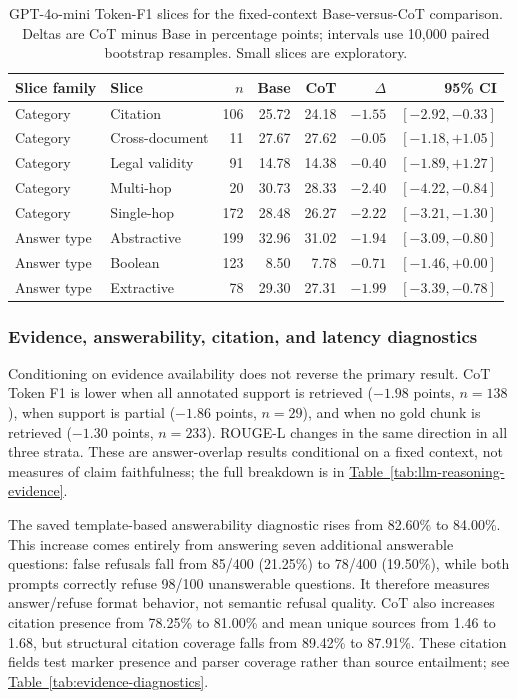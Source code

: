 \begin{table}[t]
\centering
\scriptsize
\caption{GPT-4o-mini Token-F1 slices for the fixed-context Base-versus-CoT
comparison. Deltas are CoT minus Base in percentage points; intervals use
10,000 paired bootstrap resamples. Small slices are exploratory.}
\label{tab:llm-reasoning-slices}
\begin{tabular}{llrrrrr}
\toprule
\textbf{Slice family} & \textbf{Slice} & \textbf{$n$} &
\textbf{Base} & \textbf{CoT} & \textbf{$\Delta$} & \textbf{95\% CI} \\
\midrule
Category & Citation & 106 & 25.72 & 24.18 & $-1.55$ & $[-2.92,-0.33]$ \\
Category & Cross-document & 11 & 27.67 & 27.62 & $-0.05$ & $[-1.18,+1.05]$ \\
Category & Legal validity & 91 & 14.78 & 14.38 & $-0.40$ & $[-1.89,+1.27]$ \\
Category & Multi-hop & 20 & 30.73 & 28.33 & $-2.40$ & $[-4.22,-0.84]$ \\
Category & Single-hop & 172 & 28.48 & 26.27 & $-2.22$ & $[-3.21,-1.30]$ \\
\midrule
Answer type & Abstractive & 199 & 32.96 & 31.02 & $-1.94$ & $[-3.09,-0.80]$ \\
Answer type & Boolean & 123 & 8.50 & 7.78 & $-0.71$ & $[-1.46,+0.00]$ \\
Answer type & Extractive & 78 & 29.30 & 27.31 & $-1.99$ & $[-3.39,-0.78]$ \\
\bottomrule
\end{tabular}
\end{table}

\subsubsection{Evidence, answerability, citation, and latency diagnostics}

Conditioning on evidence availability does not reverse the primary result.
CoT Token F1 is lower when all annotated support is retrieved ($-1.98$
points, $n=138$), when support is partial ($-1.86$ points, $n=29$), and when
no gold chunk is retrieved ($-1.30$ points, $n=233$). ROUGE-L changes in the
same direction in all three strata. These are answer-overlap results
conditional on a fixed context, not measures of claim faithfulness; the full
breakdown is in
\hyperref[tab:llm-reasoning-evidence]{Table~\ref*{tab:llm-reasoning-evidence}}.

The saved template-based answerability diagnostic rises from 82.60\% to
84.00\%. This increase comes entirely from answering seven additional
answerable questions: false refusals fall from 85/400 (21.25\%) to 78/400
(19.50\%), while both prompts correctly refuse 98/100 unanswerable questions.
It therefore measures answer/refuse format behavior, not semantic refusal
quality. CoT also increases citation presence from 78.25\% to 81.00\% and
mean unique sources from 1.46 to 1.68, but structural citation coverage falls
from 89.42\% to 87.91\%. These citation fields test marker presence and parser
coverage rather than source entailment; see
\hyperref[tab:evidence-diagnostics]{Table~\ref*{tab:evidence-diagnostics}}.

